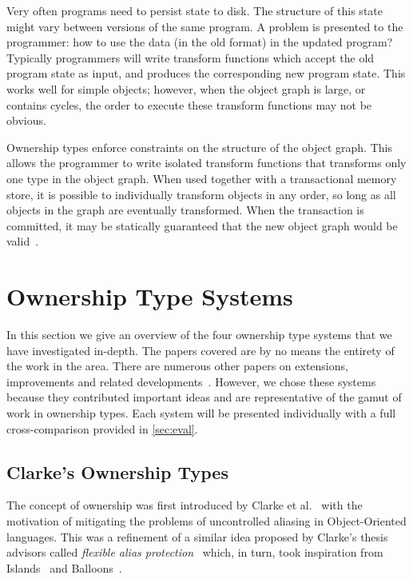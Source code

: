 \documentclass{acm_proc_article-sp}
\begin{document}
Very often programs need to persist state to disk. The structure of this state
might vary between versions of the same program. A problem is presented to the
programmer: how to use the data (in the old format) in the updated program?
Typically programmers will write transform functions which accept the old
program state as input, and produces the corresponding new program state. This
works well for simple objects; however, when the object graph is large, or
contains cycles, the order to execute these transform functions may not be
obvious.

Ownership types enforce constraints on the structure of the object graph. This
allows the programmer to write isolated transform functions that transforms only
one type in the object graph. When used together with a transactional memory
store, it is possible to individually transform objects in any order, so long as
all objects in the graph are eventually transformed. When the transaction is
committed, it may be statically guaranteed that the new object graph would be
valid~\cite{boyapati04safejava,boyapati03innerclass}.

\section{Ownership Type Systems}
\label{sec:systems}

In this section we give an overview of the four ownership type systems that we
have investigated in-depth. The papers covered are by no means the entirety of
the work in the area. There are numerous other papers on extensions,
improvements and related developments~\cite{clarke13survey}. However, we chose
these systems because they contributed important ideas and are
representative of the gamut of work in ownership types. Each system will be
presented individually with a full cross-comparison provided in \cref{sec:eval}.

\subsection{Clarke's Ownership Types}
\label{subsec:clarke}

The concept of ownership was first introduced by Clarke et
al.~\cite{clarke98ownership,clarke01ownership} with the motivation of
mitigating the problems of uncontrolled aliasing in Object-Oriented languages.
This was a refinement of a similar idea proposed by Clarke's thesis advisors
called \emph{flexible alias protection}~\cite{noble98alias} which, in turn,
took inspiration from Islands~\cite{hogg91islands} and
Balloons~\cite{almeida97balloons}.
\end{document}
